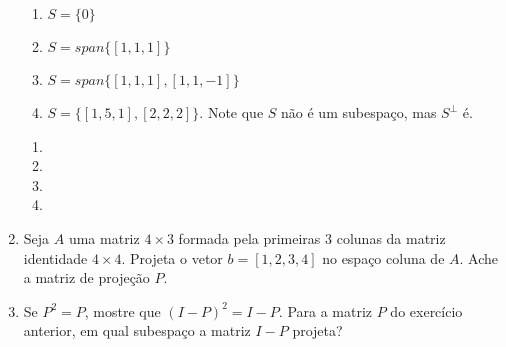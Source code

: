 \documentclass[leqno]{article}
\begin{document}
\begin{enumerate}
\begin{enumerate}
\item $S = \{0\}$

\item $S = span\{[1,1,1]\}$

\item $S = span\{[1,1,1], [1,1,-1]\}$

\item $S = \{[1,5,1], [2,2,2]\}$. Note que $S$ não é um subespaço, mas $S^\perp$ é.

\end{enumerate}

\begin{sol}
	\vspace{-\baselineskip} 
	\begin{enumerate}    
		\item %
		\item %
		\item %
		\item %
	\end{enumerate}    
\end{sol} 



\item Seja $A$ uma matriz $4 \times 3$ formada pela primeiras 3 colunas da matriz identidade $4 \times 4$. Projeta o vetor $b = [1,2,3,4]$ no espaço coluna de $A$. Ache a matriz de projeção $P$.

\begin{sol} 
\end{sol} 



\item Se $P^2 = P$, mostre que $(I - P)^2 = I - P$. Para a matriz $P$ do exercício anterior, em qual subespaço a matriz $I - P$ projeta?

\begin{sol} 
\end{sol} 
\end{enumerate}
\end{document}
